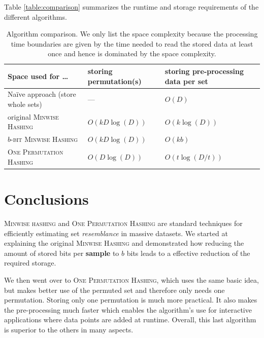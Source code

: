 \documentclass[a4paper]{article}
\begin{document}
Table \vref{table:comparison} summarizes the runtime and storage requirements of the different algorithms.

\begin{table}[H]
{
\renewcommand{\arraystretch}{1.2}
\begin{tabulary}{1\textwidth}{LLL}
\hline \textbf{Space used for \ldots}
& storing permutation(s) & storing pre-processing data per set \\
\hline Na\"{i}ve approach (store whole sets) & --- & $O(D)$ \\
\hline original \textsc{Minwise Hashing} & $O(kD\log(D))$ & $O(k\log(D))$ \\
\hline \textsc{$b$-bit Minwise Hashing} & $O(kD\log(D))$ & $O(kb)$ \\
\hline \textsc{One Permutation Hashing} & $O(D\log(D))$ & $O(t \log(D/t))$ \\
\hline
\end{tabulary}
}
\caption{Algorithm comparison. We only list the space complexity because the processing time boundaries are given by the time needed to read the stored data at least once and hence is dominated by the space complexity.}
\label{table:comparison}
\end{table}


\section{Conclusions}

\textsc{Minwise hashing} and \textsc{One Permutation Hashing} are standard techniques for efficiently estimating set \emph{resemblance} in massive datasets. We started at explaining the original \textsc{Minwise Hashing} and demonstrated how reducing the amount of stored bits per \textbf{sample} to $b$ bits leads to a effective reduction of the required storage.

We then went over to \textsc{One Permutation Hashing}, which uses the same basic idea, but makes better use of the permuted set and therefore only needs one permutation. Storing only one permutation is much more practical. It also makes the pre-processing much faster which enables the algorithm's use for interactive applications where data points are added at runtime. Overall, this last algorithm is superior to the others in many aspects.



\end{document}
